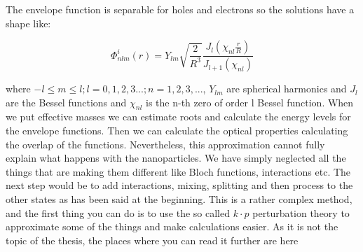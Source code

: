 The envelope function is separable for holes and electrons so the solutions have a shape like:

\begin{equation}
\Phi _{nlm} ^i(r) = Y_{lm} \sqrt{\frac{2}{R^3}} \frac{J_l(\chi _{nl}\frac{r}{R})}{J_{l+1}(\chi _{nl})}
\end{equation}

where $-l \leq m \leq l; l = 0,1,2,3...; n = 1,2,3,...$, $Y_{lm}$ are spherical harmonics and $J_l$ are the Bessel functions and $\chi _{nl}$ is the n-th zero of order l Bessel function. When we put effective masses we can estimate roots and calculate the energy levels for the envelope functions. Then we can calculate the optical properties calculating the overlap of the functions. Nevertheless, this approximation cannot fully explain what happens with the nanoparticles. We have simply neglected all the things that are making them different like Bloch functions, interactions etc. The next step would be to add interactions, mixing, splitting and then process to the other states as has been said at the beginning. This is a rather complex method, and the first thing you can do is to use the so called $k\cdot p$ perturbation theory to approximate some of the things and make calculations easier. As it is not the topic of the thesis, the places where you can read it further are here \cite{Klimov} \cite{ulrike} \cite{fox} \cite{dotsy}